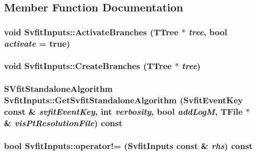 \subsection{Member Function Documentation}
\hypertarget{classSvfitInputs_af56198966e4b7c1eca905a31acf586c4}{
\subsubsection[{ActivateBranches}]{\setlength{\rightskip}{0pt plus 5cm}void SvfitInputs::ActivateBranches (TTree $\ast$ {\em tree}, \/  bool {\em activate} = {\ttfamily true})}}
\label{classSvfitInputs_af56198966e4b7c1eca905a31acf586c4}
\hypertarget{classSvfitInputs_a0620e8f725be08d3097a5cebb90adf0b}{
\subsubsection[{CreateBranches}]{\setlength{\rightskip}{0pt plus 5cm}void SvfitInputs::CreateBranches (TTree $\ast$ {\em tree})}}
\label{classSvfitInputs_a0620e8f725be08d3097a5cebb90adf0b}
\hypertarget{classSvfitInputs_aa89032ea9c7ace07c00243dab364a602}{
\subsubsection[{GetSvfitStandaloneAlgorithm}]{\setlength{\rightskip}{0pt plus 5cm}SVfitStandaloneAlgorithm SvfitInputs::GetSvfitStandaloneAlgorithm ({\bf SvfitEventKey} const \& {\em svfitEventKey}, \/  int {\em verbosity}, \/  bool {\em addLogM}, \/  TFile $\ast$\& {\em visPtResolutionFile}) const}}
\label{classSvfitInputs_aa89032ea9c7ace07c00243dab364a602}
\hypertarget{classSvfitInputs_aaab59815bf07360974d7595daa4d33b9}{
\subsubsection[{operator!=}]{\setlength{\rightskip}{0pt plus 5cm}bool SvfitInputs::operator!= ({\bf SvfitInputs} const \& {\em rhs}) const}}
